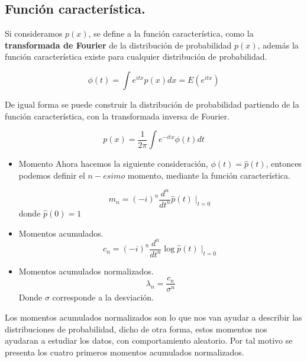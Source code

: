 \subsection{Función característica.}

Si consideramos $p(x)$, se define a la función característica, como la \textbf{transformada de Fourier} de la distribución de probabilidad $p(x)$, además la función característica existe para cualquier distribución de probabilidad.

\begin{tcolorbox}[colback=mycafeF!5!white,colframe=mycafeF,title=\textbf{Función Característica}]
\begin{equation}
    \phi(t) = \int e^{itx}p(x)dx = E(e^{itx})
    \label{eq:FunCaracteristica}
\end{equation}

De igual forma se puede construir la distribución de probabilidad partiendo de la función característica, con la transformada inversa de Fourier.

\begin{equation}
	p(x) = \frac{1}{2\pi} \int e^{-itx} \phi(t) dt
\end{equation}
    
\end{tcolorbox}
\begin{itemize}
	\item Momento
Ahora hacemos la siguiente consideración, $\phi(t) = \hat{p}(t)$, entonces podemos definir el $n-esimo$ momento, mediante la función característica.

\begin{equation}
	m_n = (-i)^n \frac{d^n}{dt^n}\hat{p}(t)\mid_{t=0}
\end{equation}
donde $\hat{p}(0) = 1$
	\item Momentos acumulados.
	\begin{equation}
		c_n = (-i)^n \frac{d^n}{dt^n}\log\hat{p}(t)\mid_{t=0}
	\end{equation}
	\item Momentos acumulados normalizados.
	\begin{equation}
		\lambda_n = \frac{c_n}{\sigma^n}
	\end{equation}
	Donde $\sigma$ corresponde a la desviación.

\end{itemize}

Los momentos acumulados normalizados son lo que nos van ayudar a describir las distribuciones de probabilidad, dicho de otra forma, estos momentos nos ayudaran a estudiar los datos, con comportamiento aleatorio. Por tal motivo se presenta los cuatro primeros momentos acumulados normalizados.

